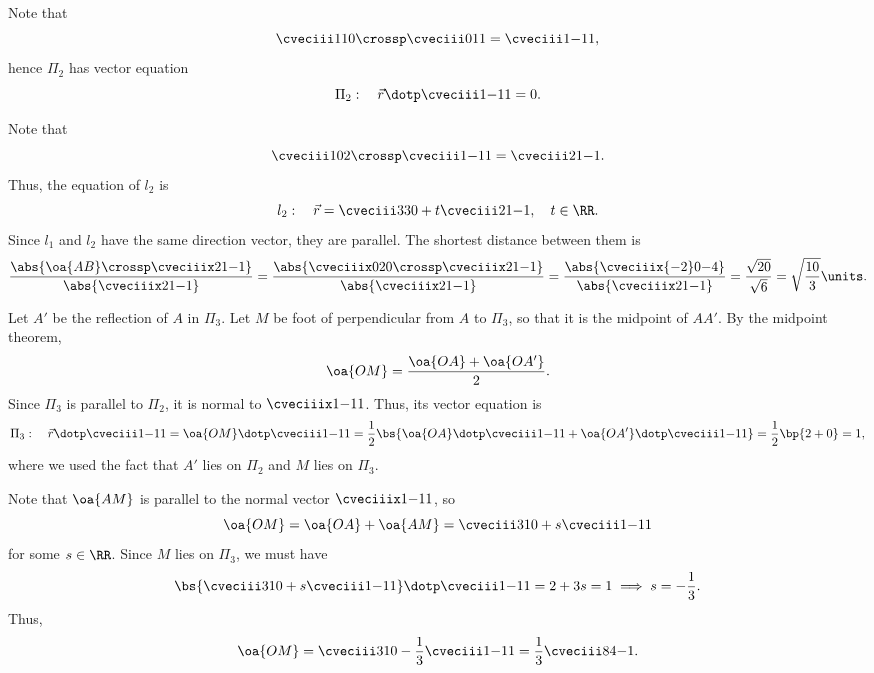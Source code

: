 \begin{solution}
    Note that \[\cveciii110 \crossp \cveciii011 = \cveciii1{-1}{1},\] hence $\Pi_2$ has vector equation \[\Pi_2: \quad \vec r \dotp \cveciii1{-1}1 = 0.\]

    \begin{ppart}
        Note that \[\cveciii102 \crossp \cveciii1{-1}1 = \cveciii21{-1}.\] Thus, the equation of $l_2$ is \[l_2: \quad \vec r = \cveciii330 + t \cveciii21{-1}, \quad t \in \RR.\] Since $l_1$ and $l_2$ have the same direction vector, they are parallel. The shortest distance between them is \[\frac{\abs{\oa{AB} \crossp \cveciiix21{-1}}}{\abs{\cveciiix21{-1}}} = \frac{\abs{\cveciiix020 \crossp \cveciiix21{-1}}}{\abs{\cveciiix21{-1}}} = \frac{\abs{\cveciiix{-2}0{-4}}}{\abs{\cveciiix21{-1}}} = \frac{\sqrt{20}}{\sqrt{6}} = \sqrt{\frac{10}3} \units.\]
    \end{ppart}
    \begin{ppart}
        Let $A'$ be the reflection of $A$ in $\Pi_3$. Let $M$ be foot of perpendicular from $A$ to $\Pi_3$, so that it is the midpoint of $AA'$. By the midpoint theorem, \[\oa{OM} = \frac{\oa{OA} + \oa{OA'}}{2}.\] Since $\Pi_3$ is parallel to $\Pi_2$, it is normal to $\cveciiix1{-1}1$. Thus, its vector equation is \[\Pi_3: \quad \vec r \dotp \cveciii1{-1}1 = \oa{OM} \dotp \cveciii1{-1}1 = \frac12 \bs{\oa{OA} \dotp \cveciii1{-1}1 + \oa{OA'} \dotp \cveciii1{-1}1} = \frac12 \bp{2 + 0} = 1,\] where we used the fact that $A'$ lies on $\Pi_2$ and $M$ lies on $\Pi_3$.

        Note that $\oa{AM}$ is parallel to the normal vector $\cveciiix1{-1}1$, so \[\oa{OM} = \oa{OA} + \oa{AM} = \cveciii310 + s \cveciii1{-1}1\] for some $s \in \RR$. Since $M$ lies on $\Pi_3$, we must have \[\bs{\cveciii310 + s \cveciii1{-1}1} \dotp \cveciii1{-1}1 = 2 + 3s = 1 \implies s =  -\frac13.\] Thus, \[\oa{OM} = \cveciii310 - \frac13 \cveciii1{-1}1 = \frac13 \cveciii84{-1}.\]
    \end{ppart}
\end{solution}

